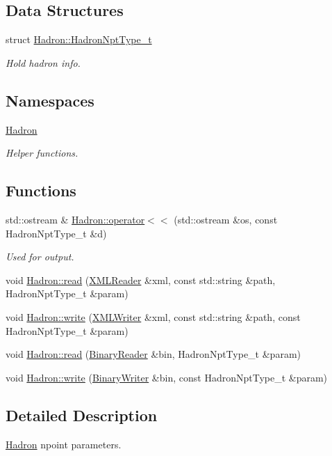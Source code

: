 \subsection*{Data Structures}
\begin{DoxyCompactItemize}
\item 
struct \mbox{\hyperlink{structHadron_1_1HadronNptType__t}{Hadron\+::\+Hadron\+Npt\+Type\+\_\+t}}
\begin{DoxyCompactList}\small\item\em Hold hadron info. \end{DoxyCompactList}\end{DoxyCompactItemize}
\subsection*{Namespaces}
\begin{DoxyCompactItemize}
\item 
 \mbox{\hyperlink{namespaceHadron}{Hadron}}
\begin{DoxyCompactList}\small\item\em Helper functions. \end{DoxyCompactList}\end{DoxyCompactItemize}
\subsection*{Functions}
\begin{DoxyCompactItemize}
\item 
std\+::ostream \& \mbox{\hyperlink{namespaceHadron_ae2a5c7a5ffdda238337fd194679743a6}{Hadron\+::operator$<$$<$}} (std\+::ostream \&os, const Hadron\+Npt\+Type\+\_\+t \&d)
\begin{DoxyCompactList}\small\item\em Used for output. \end{DoxyCompactList}\item 
void \mbox{\hyperlink{namespaceHadron_ae9e95e7c9b97a878e77c48ea5619a53a}{Hadron\+::read}} (\mbox{\hyperlink{classADATXML_1_1XMLReader}{X\+M\+L\+Reader}} \&xml, const std\+::string \&path, Hadron\+Npt\+Type\+\_\+t \&param)
\item 
void \mbox{\hyperlink{namespaceHadron_a3ba652c4917e69b9056f2dd7621483df}{Hadron\+::write}} (\mbox{\hyperlink{classADATXML_1_1XMLWriter}{X\+M\+L\+Writer}} \&xml, const std\+::string \&path, const Hadron\+Npt\+Type\+\_\+t \&param)
\item 
void \mbox{\hyperlink{namespaceHadron_a7f12085b340a6e0bfb52b3d920cfeb1e}{Hadron\+::read}} (\mbox{\hyperlink{classADATIO_1_1BinaryReader}{Binary\+Reader}} \&bin, Hadron\+Npt\+Type\+\_\+t \&param)
\item 
void \mbox{\hyperlink{namespaceHadron_a0051134178fb8346e89720a478b8a8f1}{Hadron\+::write}} (\mbox{\hyperlink{classADATIO_1_1BinaryWriter}{Binary\+Writer}} \&bin, const Hadron\+Npt\+Type\+\_\+t \&param)
\end{DoxyCompactItemize}


\subsection{Detailed Description}
\mbox{\hyperlink{namespaceHadron}{Hadron}} npoint parameters. 


